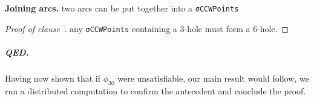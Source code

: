 \textbf{Joining arcs.} two arcs can be put together into a \lstinline|σCCWPoints|


\begin{proof}[Proof of clause~]
any \lstinline|σCCWPoints| containing a $3$-hole must form a $6$-hole.
\end{proof}

\subparagraph*{QED.}
Having now shown that if $\phi_{30}$ were unsatisfiable,
our main result would follow,
we run a distributed computation to confirm the antecedent
and conclude the proof.
